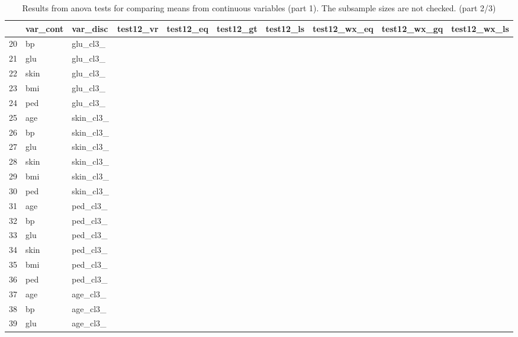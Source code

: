 \documentclass[12pt]{article}
\begin{document}
\begin{landscape}
\newpage
\begin{table}[ht]
\centering
\begin{tabular}{rlllllllll}
  \hline
 & var\_cont & var\_disc & test12\_vr & test12\_eq & test12\_gt & test12\_ls & test12\_wx\_eq & test12\_wx\_gq & test12\_wx\_ls \\ 
  \hline
20 & bp & glu\_cl3\_ &   &   &   &   &   &   &   \\ 
  21 & glu & glu\_cl3\_ &   &   &   &   &   &   &   \\ 
  22 & skin & glu\_cl3\_ &   &   &   &   &   &   &   \\ 
  23 & bmi & glu\_cl3\_ &   &   &   &   &   &   &   \\ 
  24 & ped & glu\_cl3\_ &   &   &   &   &   &   &   \\ 
  25 & age & skin\_cl3\_ &   &   &   &   &   &   &   \\ 
  26 & bp & skin\_cl3\_ &   &   &   &   &   &   &   \\ 
  27 & glu & skin\_cl3\_ &   &   &   &   &   &   &   \\ 
  28 & skin & skin\_cl3\_ &   &   &   &   &   &   &   \\ 
  29 & bmi & skin\_cl3\_ &   &   &   &   &   &   &   \\ 
  30 & ped & skin\_cl3\_ &   &   &   &   &   &   &   \\ 
  31 & age & ped\_cl3\_ &   &   &   &   &   &   &   \\ 
  32 & bp & ped\_cl3\_ &   &   &   &   &   &   &   \\ 
  33 & glu & ped\_cl3\_ &   &   &   &   &   &   &   \\ 
  34 & skin & ped\_cl3\_ &   &   &   &   &   &   &   \\ 
  35 & bmi & ped\_cl3\_ &   &   &   &   &   &   &   \\ 
  36 & ped & ped\_cl3\_ &   &   &   &   &   &   &   \\ 
  37 & age & age\_cl3\_ &   &   &   &   &   &   &   \\ 
  38 & bp & age\_cl3\_ &   &   &   &   &   &   &   \\ 
  39 & glu & age\_cl3\_ &   &   &   &   &   &   &   \\ 
   \hline
\end{tabular}
\caption{Results from anova tests for comparing means from continuous variables (part 1). The subsample sizes are not checked. (part 2/3)} 
\label{tab:anova.test1.2}
\end{table}
 

\end{landscape}
\end{document}
